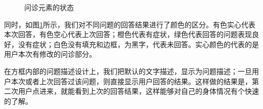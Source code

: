 \begin{figure}[h]
    \centering
    \caption{问诊元素的状态}
    \label{fig:question_status}
\end{figure}

同时，如图\ref{fig:question_status}所示，我们对不同问题的回答结果进行了颜色的区分。有色实心代表本次回答，有色空心代表上次回答；橙色代表有症状，绿色代表回答的问题表现良好，没有症状；白色没有填充和边框，为黑字，代表未回答。实心颜色的代表的是用户本次有修改的问诊部分。

在方框内部的问题描述设计上，我们把默认的文字描述，显示为问题描述；一旦用户本次或者上次回答过该问题，则直接显示用户回答的结果。这样做的结果是，第二次用户点进来，就能看到上次的回答结果，这样能够对自己的身体情况有个快速的了解。


